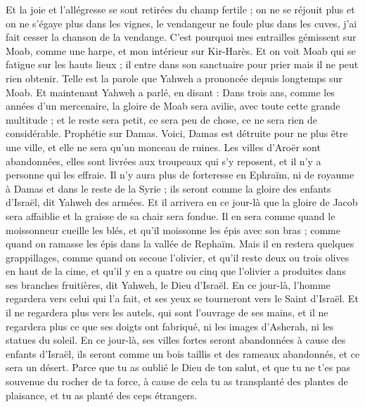 \begin{multicols}{2}
Et la joie et l'allégresse se sont retirées du champ fertile ; on ne se réjouit plus et on ne s'égaye plus dans les vignes, le vendangeur ne foule plus dans les cuves, j'ai fait cesser la chanson de la vendange.
C'est pourquoi mes entrailles gémissent sur Moab, comme une harpe, et mon intérieur sur Kir-Harès.
Et on voit Moab qui se fatigue sur les hauts lieux ; il entre dans son sanctuaire pour prier mais il ne peut rien obtenir.
Telle est la parole que Yahweh a prononcée depuis longtemps sur Moab.
Et maintenant Yahweh a parlé, en disant : Dans trois ans, comme les années d'un mercenaire, la gloire de Moab sera avilie, avec toute cette grande multitude ; et le reste sera petit, ce sera peu de chose, ce ne sera rien de considérable.
\VerseOne{}Prophétie sur Damas. Voici, Damas est détruite pour ne plus être une ville, et elle ne sera qu'un monceau de ruines.
Les villes d'Aroër sont abandonnées, elles sont livrées aux troupeaux qui s'y reposent, et il n'y a personne qui les effraie.
Il n'y aura plus de forteresse en Ephraïm, ni de royaume à Damas et dans le reste de la Syrie ; ils seront comme la gloire des enfants d'Israël, dit Yahweh des armées.
Et il arrivera en ce jour-là que la gloire de Jacob sera affaiblie et la graisse de sa chair sera fondue.
Il en sera comme quand le moissonneur cueille les blés, et qu'il moissonne les épis avec son bras ; comme quand on ramasse les épis dans la vallée de Rephaïm.
Mais il en restera quelques grappillages, comme quand on secoue l'olivier, et qu'il reste deux ou trois olives en haut de la cime, et qu'il y en a quatre ou cinq que l'olivier a produites dans ses branches fruitières, dit Yahweh, le Dieu d'Israël.
En ce jour-là, l'homme regardera vers celui qui l'a fait, et ses yeux se tourneront vers le Saint d'Israël.
Et il ne regardera plus vers les autels, qui sont l'ouvrage de ses mains, et il ne regardera plus ce que ses doigts ont fabriqué, ni les images d'Asherah, ni les statues du soleil.
En ce jour-là, ses villes fortes seront abandonnées à cause des enfants d'Israël, ils seront comme un bois taillis et des rameaux abandonnés, et ce sera un désert.
Parce que tu as oublié le Dieu de ton salut, et que tu ne t'es pas souvenue du rocher de ta force, à cause de cela tu as transplanté des plantes de plaisance, et tu as planté des ceps étrangers.

\end{multicols}
